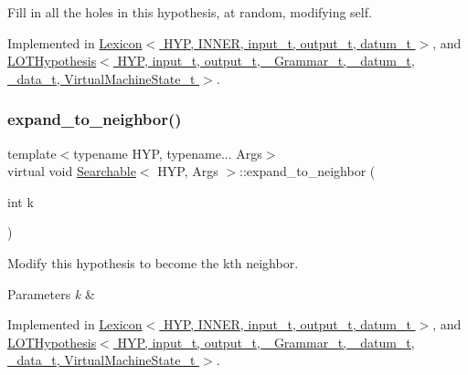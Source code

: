 Fill in all the holes in this hypothesis, at random, modifying self. 



Implemented in \hyperlink{class_lexicon_a724ccdaffe9090488bfaa786873fa807}{Lexicon$<$ H\+Y\+P, I\+N\+N\+E\+R, input\+\_\+t, output\+\_\+t, datum\+\_\+t $>$}, and \hyperlink{class_l_o_t_hypothesis_a7f913b702b434003f94a84c560d16bf9}{L\+O\+T\+Hypothesis$<$ H\+Y\+P, input\+\_\+t, output\+\_\+t, \+\_\+\+Grammar\+\_\+t, \+\_\+datum\+\_\+t, \+\_\+data\+\_\+t, Virtual\+Machine\+State\+\_\+t $>$}.

\mbox{\label{class_searchable_a1786307b9f2dadc8c66c94adef220270}} 
\subsubsection{\texorpdfstring{expand\+\_\+to\+\_\+neighbor()}{expand\_to\_neighbor()}}
{\footnotesize\ttfamily template$<$typename H\+YP, typename... Args$>$ \\
virtual void \hyperlink{class_searchable}{Searchable}$<$ H\+YP, Args $>$\+::expand\+\_\+to\+\_\+neighbor (\begin{DoxyParamCaption}\item[{int}]{k }\end{DoxyParamCaption})\hspace{0.3cm}{\ttfamily [pure virtual]}}



Modify this hypothesis to become the k\textquotesingle{}th neighbor. 


\begin{DoxyParams}{Parameters}
{\em k} & \\
\hline
\end{DoxyParams}


Implemented in \hyperlink{class_lexicon_a2b17608f66415c6a7d55b6a8f344db21}{Lexicon$<$ H\+Y\+P, I\+N\+N\+E\+R, input\+\_\+t, output\+\_\+t, datum\+\_\+t $>$}, and \hyperlink{class_l_o_t_hypothesis_ab24d0b8faa360f6a0edc4eefb17d6de7}{L\+O\+T\+Hypothesis$<$ H\+Y\+P, input\+\_\+t, output\+\_\+t, \+\_\+\+Grammar\+\_\+t, \+\_\+datum\+\_\+t, \+\_\+data\+\_\+t, Virtual\+Machine\+State\+\_\+t $>$}.

\mbox{\label{class_searchable_a23786e95730117c3cc4b90e010494a1e}} 
